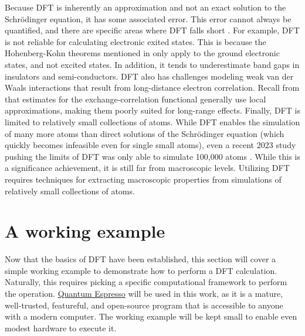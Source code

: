 Because DFT is inherently an approximation and not an exact solution to the
Schr\"odinger equation, it has some associated error. This error cannot always
be quantified, and there are specific areas where DFT falls short \cite{sholl}.
For example, DFT is not reliable for calculating electronic exited states. This
is because the Hohenberg-Kohn theorems mentioned in  only
apply to the ground electronic states, and not excited states. In addition, it
tends to underestimate band gaps in insulators and semi-conductors.
DFT also has challenges modeling weak van der Waals interactions that result
from long-distance electron correlation. Recall from  that
estimates for the exchange-correlation functional generally use local
approximations, making them poorly suited for long-range effects. Finally,
DFT is limited to relatively small collections of atoms. While DFT enables
the simulation of many more atoms than direct solutions of the Schr\"odinger
equation (which quickly becomes infeasible even for single small atoms), even
a recent 2023 study pushing the limits of DFT was only able to simulate 100,000
atoms \cite{dogan}. While this is a significance achievement, it is still far
from macroscopic levels. Utilizing DFT requires techniques for extracting
macroscopic properties from simulations of relatively  small
collections of atoms.

\section{A working example}

Now that the basics of DFT have been established, this section will cover a
simple working example to demonstrate how to perform a DFT calculation.
Naturally, this requires picking a specific computational framework to
perform the operation.
\href{https://www.quantum-espresso.org/}{Quantum Espresso} will be used in
this work, as it is a mature, well-trusted, featureful, and open-source
program that is accessible to anyone with a modern computer. The working
example will be kept small to enable even modest hardware to execute it.

